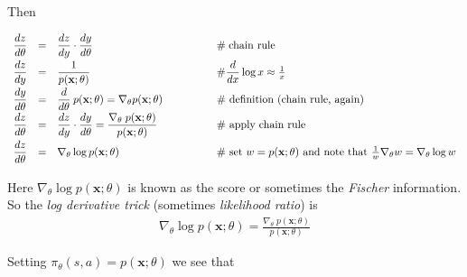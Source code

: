 \documentclass[11pt, oneside]{article}   	%
\begin{document}
\bigskip
\noindent
Then 

\begin{equation*}
\begin{array}{lllll}
\vspace{0.80mm}
\dfrac{dz}{d \theta} 
&=&                   \dfrac{dz}{dy} \cdot \dfrac{dy}{d\theta}                                               & \qquad \qquad \mathrel{\#}  \text{chain rule} \\
\vspace{0.80mm}
\dfrac{dz}{dy} 
&=&                     \dfrac{1}{p(\mathbf{x};\theta)}                                                        & \qquad \qquad \mathbin{\#} \dfrac{d}{dx} \log x \approx \frac{1}{x} \\
\vspace{0.80mm}
 \dfrac{dy}{d\theta} 
 &=& \dfrac{d}{d\theta}  \:p(\mathbf{x};\theta) = \nabla_\theta p(\mathbf{x};\theta)   & \qquad \qquad  \mathbin{\#} \text{ definition (chain rule, again)}\\
 \vspace{0.80mm}
 \dfrac{dz}{d \theta} 
 &=&          \dfrac{dz}{dy} \cdot \dfrac{dy}{d\theta} = \dfrac{\nabla_\theta \; p(\mathbf{x};\theta)}{p(\mathbf{x};\theta)} & \qquad \qquad  \mathbin{\#} \text{ apply chain rule} \\
 \vspace{0.80mm}
 \dfrac{dz}{d \theta} 
&=&  \nabla_\theta \log p(\mathbf{x};\theta)                                           & \qquad \qquad\mathbin{\#} \text{ set $w = p(\mathbf{x};\theta)$ and note that } \frac{1}{w}\nabla_\theta w = \nabla_{\theta} \log w
\end{array}
\end{equation*}

\bigskip
\noindent
Here $\nabla_\theta \log p(\mathbf{x};\theta)$ is known as the score or sometimes the \emph{Fischer} information. So the \emph{log derivative trick} (sometimes \emph{likelihood ratio}) is 
\begin{align*}
\nabla_\theta \log p(\mathbf{x};\theta)   = \frac{\nabla_\theta \; p(\mathbf{x};\theta)}{p(\mathbf{x};\theta)}
\end{align*}

\bigskip
\noindent
Setting  $\pi_\theta(s,a) = p(\mathbf{x};\theta)$ we see that
\end{document}
